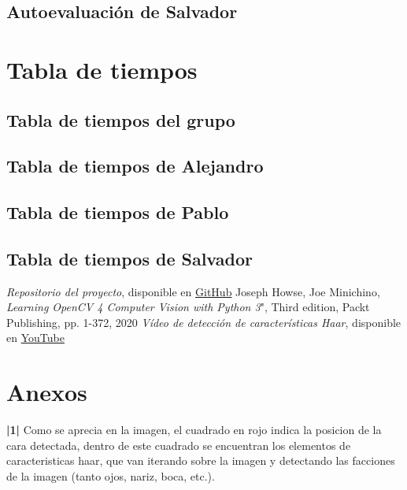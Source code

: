 \documentclass[a4paper]{article}
\begin{document}
\subsection{Autoevaluación de Salvador}

\section{Tabla de tiempos}

\subsection{Tabla de tiempos del grupo}

\subsection{Tabla de tiempos de Alejandro}

\subsection{Tabla de tiempos de Pablo}

\subsection{Tabla de tiempos de Salvador}

\newpage
\begin{thebibliography}{99}
 \textit{Repositorio del proyecto}, disponible en \href{https://github.com/PacktPublishing/Learning-OpenCV-4-Computer-Vision-with-Python-Third-Edition}{GitHub}
 Joseph Howse, Joe Minichino, \textit{Learning OpenCV 4 Computer Vision with Python 3}", Third edition, Packt Publishing, pp. 1-372, 2020
 \textit{Vídeo de detección de características Haar}, disponible en \href{https://youtu.be/hPCTwxF0qf4}{YouTube}
\end{thebibliography}

\newpage
\section*{Anexos}
\textbf{|1|} Como se aprecia en la imagen, el cuadrado en rojo indica la posicion de la cara detectada, dentro de este cuadrado se encuentran los elementos de caracteristicas haar, que van iterando sobre la imagen y detectando las facciones de la imagen (tanto ojos, nariz, boca, etc.).
\end{document}
